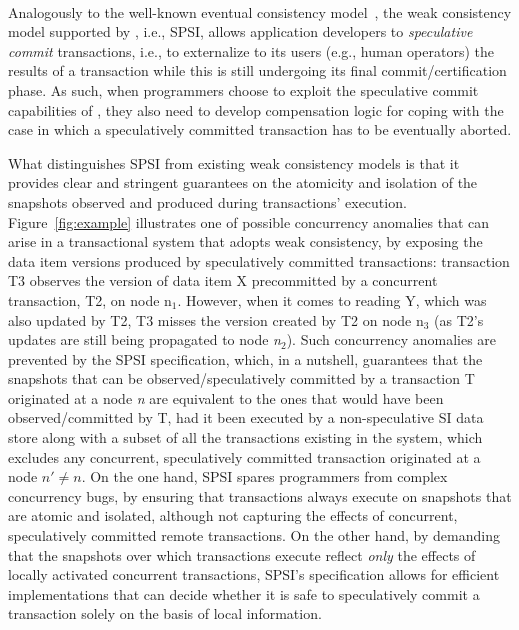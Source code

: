 ~\\
 Analogously to the well-known eventual consistency model~\cite{brewer2012cap}, the weak consistency model supported by \specula, i.e., SPSI, allows application developers to \textit{speculative commit} transactions, i.e., to externalize to its users (e.g., human operators) the results of a transaction while this is still undergoing its final commit/certification phase. As such, when programmers choose to exploit the speculative commit capabilities of \specula, they also need to develop compensation logic for coping with the case in which a speculatively committed transaction has to be eventually aborted.

What distinguishes SPSI from existing weak consistency models is that it provides clear and stringent guarantees on the atomicity and isolation of the snapshots observed and produced during transactions' execution. Figure~\ref{fig:example} illustrates one of possible concurrency anomalies that can arise in a transactional system that adopts weak consistency, by exposing the data item versions produced by speculatively committed transactions: transaction T3 observes the version of data item X precommitted by a concurrent transaction, T2, on node n$_1$. However, when it comes to reading Y, which was also updated by T2, T3 misses the version created by T2 on node n$_3$ (as T2's updates are still being propagated to node \textit{n$_2$}). Such concurrency anomalies are prevented by the SPSI specification, which, in a nutshell, guarantees that the snapshots that can be observed/speculatively committed by a transaction T originated at a node \textit{n}
%
% 
 are equivalent to the ones that would have been observed/committed by T, had it been executed by a non-speculative SI data store along with a subset of all the transactions existing in the system, which excludes any concurrent, speculatively committed transaction originated at a node $n'\neq n$.
% 
% 
%  
% 
 On the one hand,  SPSI  spares programmers from complex concurrency bugs, by ensuring that  transactions always execute on snapshots that are atomic and isolated, although not capturing the effects of concurrent, speculatively committed remote transactions. On the other hand, by demanding that the snapshots over which transactions execute reflect \textit{only} the effects of locally activated concurrent transactions, SPSI's specification allows for efficient implementations that can decide whether it is safe to speculatively commit a transaction solely on the basis of local information.

